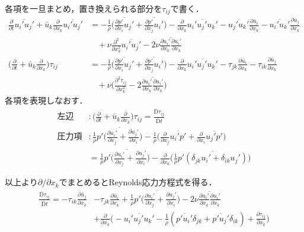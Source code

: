 \documentclass[12pt,a4paper]{jsarticle}
\begin{document}
各項を一旦まとめ，置き換えられる部分を$\tau_{ij}$で書く．
\begin{align*}
  \frac{\partial}{\partial t} \overline{u_i' u_j'} +\bar{u}_k \frac{\partial}{\partial x_k} \overline{u_i' u_j'} &= - \frac{1}{\rho} \Big( \overline{ \frac{\partial p'}{\partial x_i} u_j' } +\overline{ \frac{\partial p'}{\partial x_j} u_i' } \Big) -\frac{\partial}{\partial x_k} \overline{u_i' u_j' u_k'} -\overline{u_j' u_k'} \frac{\partial \bar{u}_i}{\partial x_k} -\overline{u_i' u_k'} \frac{\partial \bar{u}_j}{\partial x_k} \\
    & ~~~~+\nu \frac{\partial^2}{\partial x_k^2} \overline{u_i' u_j'} -2\nu \overline{ \frac{\partial u_i'}{\partial x_k} \frac{\partial u_i'}{\partial x_k} } \\
  \Big( \frac{\partial}{\partial t} +\bar{u}_k \frac{\partial}{\partial x_k} \Big) \tau_{ij} &= - \frac{1}{\rho} \Big( \overline{ \frac{\partial p'}{\partial x_i} u_j' } +\overline{ \frac{\partial p'}{\partial x_j} u_i' } \Big) -\frac{\partial}{\partial x_k} \overline{u_i' u_j' u_k'} -\tau_{jk} \frac{\partial \bar{u}_i}{\partial x_k} -\tau_{ik} \frac{\partial \bar{u}_j}{\partial x_k} \\
    & ~~~~+\nu \Big( \frac{\partial^2 \tau_{ij}}{\partial x_k^2} -2 \overline{ \frac{\partial u_i'}{\partial x_k} \frac{\partial u_i'}{\partial x_k} } \Big)
\end{align*}
各項を表現しなおす．
\begin{align*}
  左辺 &: \Big( \frac{\partial}{\partial t} +\bar{u}_k \frac{\partial}{\partial x_k} \Big) \tau_{ij} = \frac{\overline{\mathrm{D}} \tau_{ij}}{\overline{\mathrm{D}} t} \\
  圧力項 &: \frac{1}{\rho} \overline{ p' \Big( \frac{\partial u_i'}{\partial x_j} +\frac{\partial u_j'}{\partial x_i} \Big) } -\frac{1}{\rho} \Big( \frac{\partial}{\partial x_j} \overline{u_i' p'} +\frac{\partial}{\partial x_i} \overline{u_j' p'} \Big) \\
    &=  \frac{1}{\rho} \overline{ p' \Big( \frac{\partial u_i'}{\partial x_j} +\frac{\partial u_j'}{\partial x_i} \Big) } -\frac{\partial}{\partial x_k} \Big( \frac{1}{\rho} \overline{p'(\delta_{jk}u_i' +\delta_{ik}u_j')} \Big)
\end{align*}

以上より$\partial/\partial x_k$でまとめるとReynolds応力方程式を得る．
\begin{align}
  \frac{\overline{\mathrm{D}} \tau_{ij}}{\overline{\mathrm{D}} t} = -\tau_{ik} \frac{\partial \bar{u}_j}{\partial x_k} &-\tau_{jk} \frac{\partial \bar{u}_i}{\partial x_k} +\frac{1}{\rho} \overline{ p' \Big( \frac{\partial u_i'}{\partial x_j} +\frac{\partial u_j'}{\partial x_i} \Big) } -2 \nu \overline{ \frac{\partial u_i'}{\partial x_k} \frac{\partial u_i'}{\partial x_k} } \nonumber \\
    &+\frac{\partial}{\partial x_k} \Big( -\overline{u_i' u_j' u_k'} -\frac{1}{\rho} (\overline{p'u_i'} \delta_{jk} +\overline{p'u_j'} \delta_{ik}) +\frac{\partial \tau_{ij}}{\partial x_k} \Big)
  \label{eq:ReynoldsStressEquation_foot}
\end{align}
\end{document}
